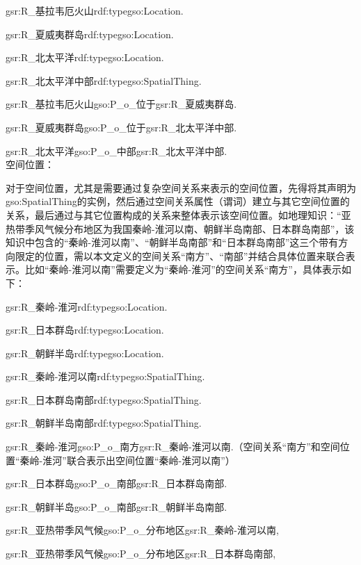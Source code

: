 gsr:R\_基拉韦厄火山\quad rdf:type\quad  gso:Location\quad  .

gsr:R\_夏威夷群岛\quad rdf:type\quad  gso:Location\quad  .

gsr:R\_北太平洋\quad rdf:type\quad  gso:Location\quad  .

gsr:R\_北太平洋中部\quad rdf:type\quad  gso:SpatialThing\quad  .

gsr:R\_基拉韦厄火山\quad  gso:P\_o\_位于\quad  gsr:R\_夏威夷群岛\quad  .

gsr:R\_夏威夷群岛\quad  gso:P\_o\_位于\quad  gsr:R\_北太平洋中部\quad  .

gsr:R\_北太平洋\quad  gso:P\_o\_中部\quad  gsr:R\_北太平洋中部\quad  .
\\

空间位置：

对于空间位置，尤其是需要通过复杂空间关系来表示的空间位置，先得将其声明为gso:SpatialThing的实例，然后通过空间关系属性（谓词）建立与其它空间位置的关系，最后通过与其它位置构成的关系来整体表示该空间位置。如地理知识：“亚热带季风气候分布地区为我国秦岭-淮河以南、朝鲜半岛南部、日本群岛南部”，该知识中包含的“秦岭-淮河以南”、“朝鲜半岛南部”和“日本群岛南部”这三个带有方向限定的位置，需以本文定义的空间关系“南方”、“南部”并结合具体位置来联合表示。比如“秦岭-淮河以南”需要定义为“秦岭-淮河”的空间关系“南方”，具体表示如下：

gsr:R\_秦岭-淮河\quad rdf:type\quad gso:Location\quad .

gsr:R\_日本群岛\quad rdf:type\quad gso:Location\quad .

gsr:R\_朝鲜半岛\quad rdf:type\quad gso:Location\quad .

gsr:R\_秦岭-淮河以南\quad rdf:type\quad gso:SpatialThing\quad .

gsr:R\_日本群岛南部\quad rdf:type\quad gso:SpatialThing\quad .

gsr:R\_朝鲜半岛南部\quad rdf:type\quad gso:SpatialThing\quad .

gsr:R\_秦岭-淮河\quad gso:P\_o\_南方\quad gsr:R\_秦岭-淮河以南\quad .（空间关系“南方”和空间位置“秦岭-淮河”联合表示出空间位置“秦岭-淮河以南”）

gsr:R\_日本群岛\quad gso:P\_o\_南部\quad gsr:R\_日本群岛南部\quad .

gsr:R\_朝鲜半岛\quad gso:P\_o\_南部\quad gsr:R\_朝鲜半岛南部\quad .

gsr:R\_亚热带季风气候\quad gso:P\_o\_分布地区\quad gsr:R\_秦岭-淮河以南\quad ,\quad 

gsr:R\_亚热带季风气候\quad gso:P\_o\_分布地区\quad gsr:R\_日本群岛南部\quad ,\quad 

